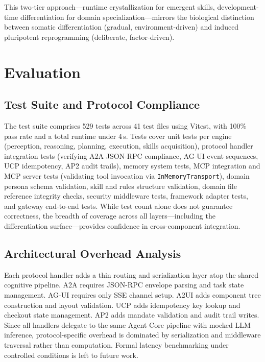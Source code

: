 \documentclass{article}
\begin{document}
This two-tier approach---runtime crystallization for emergent skills, development-time differentiation for domain specialization---mirrors the biological distinction between somatic differentiation (gradual, environment-driven) and induced pluripotent reprogramming (deliberate, factor-driven).

\section{Evaluation}
\label{sec:evaluation}

\subsection{Test Suite and Protocol Compliance}

The test suite comprises 529 tests across 41 test files using Vitest, with 100\% pass rate and a total runtime under 4\,s. Tests cover unit tests per engine (perception, reasoning, planning, execution, skills acquisition), protocol handler integration tests (verifying A2A JSON-RPC compliance, AG-UI event sequences, UCP idempotency, AP2 audit trails), memory system tests, MCP integration and MCP server tests (validating tool invocation via \texttt{InMemoryTransport}), domain persona schema validation, skill and rules structure validation, domain file reference integrity checks, security middleware tests, framework adapter tests, and gateway end-to-end tests. While test count alone does not guarantee correctness, the breadth of coverage across all layers---including the differentiation surface---provides confidence in cross-component integration.

\subsection{Architectural Overhead Analysis}

Each protocol handler adds a thin routing and serialization layer atop the shared cognitive pipeline. A2A requires JSON-RPC envelope parsing and task state management. AG-UI requires only SSE channel setup. A2UI adds component tree construction and layout validation. UCP adds idempotency key lookup and checkout state management. AP2 adds mandate validation and audit trail writes. Since all handlers delegate to the same Agent Core pipeline with mocked LLM inference, protocol-specific overhead is dominated by serialization and middleware traversal rather than computation. Formal latency benchmarking under controlled conditions is left to future work.
\end{document}
